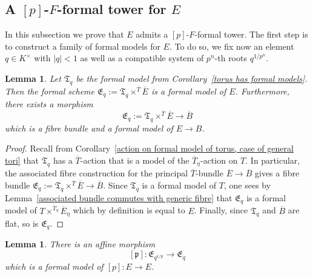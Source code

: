\documentclass[10pt,oneside]{amsart}
\newtheorem{lemma}[theorem]{Lemma}
\theoremstyle{definition}
\begin{document}
	\subsection{A $[p]$-$F$-formal tower for $E$}
	In this subsection we prove that $E$ admits a $[p]$-$F$-formal tower. The first step is to construct a family of formal models for $E$. To do so, we fix now an element $q\in K^{\times}$ with $|q|<1$ as well as a compatible system of $p^n$-th roots $q^{1/p^n}$.
	\begin{lemma}
	Let $\mathfrak T_q$ be the formal model from Corollary~\ref{torus has formal models}. Then the formal scheme $\mathfrak E_q :=\mathfrak T_q \times^{\overline{T}}\overline{E}$ is a formal model of $E$. Furthermore, there exists a morphism
	\[\mathfrak E_q :=\mathfrak T_q \times^{\overline{T}} \overline{E} \rightarrow \overline{B} \]
	which is a fibre bundle and a formal model of $E\rightarrow B$.
	\end{lemma}
	\begin{proof}
		Recall from Corollary~\ref{action on formal model of torus, case of general tori} that $\mathfrak T_q$ has a $\overline{T}$-action that is a model of the $\overline{T}_\eta$-action on $T$. In particular, the associated fibre construction for the principal $\overline{T}$-bundle $\overline{E}\rightarrow \overline{B}$ gives a fibre bundle $\mathfrak E_q :=\mathfrak T_q \times^{\overline{T}} \overline{E} \rightarrow \overline{B}$. Since $\mathfrak T_q$ is a formal model of $T$, one sees by Lemma~\ref{associated bundle commutes with generic fibre} that $\mathfrak E_q$ is a formal model of $T\times^{\overline{T}_\eta}\overline{E}_\eta$ which by definition is equal to $E$. Finally, since $\mathfrak T_q$ and $\overline{B}$ are flat, so is $\mathfrak E_q$.
	\end{proof}
	
	\begin{lemma}\label{formal model of p-multiplication on E}
		There is an affine morphism
		\[[\mathfrak p]:\mathfrak E_{q^{1/p}} \rightarrow  \mathfrak E_{q}\]
		which is a formal model of $[p]:E\rightarrow E$.
	\end{lemma}
		
\end{document}
